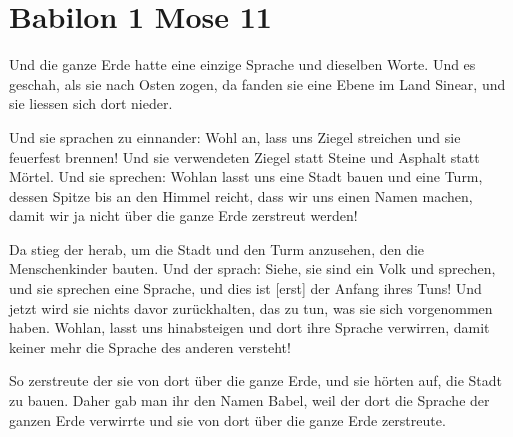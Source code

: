 \documentclass[fontsize=16pt]{mybib}
\author{Lothar Schmid}
\begin{document}
\setlength{\baselineskip}{1.5\baselineskip}

\section{Babilon 1 Mose 11}

 Und die ganze Erde hatte eine einzige Sprache und dieselben Worte.  Und es geschah, als sie nach Osten zogen, da fanden sie eine Ebene im Land Sinear, und sie liessen sich dort nieder.

Und sie sprachen zu einnander: Wohl an, lass uns Ziegel streichen und sie feuerfest brennen! Und sie verwendeten Ziegel statt Steine und Asphalt statt Mörtel. Und sie sprechen: Wohlan lasst uns eine Stadt bauen und eine Turm, dessen Spitze bis an den Himmel reicht, dass wir uns einen Namen machen, damit wir ja nicht über die ganze Erde zerstreut werden!

Da stieg der \herr herab, um die Stadt und den Turm anzusehen, den die Menschenkinder bauten. Und der \herr sprach: Siehe, sie sind ein Volk und sprechen, und sie sprechen eine Sprache, und dies ist [erst] der Anfang ihres Tuns! Und jetzt wird sie nichts davor zurückhalten, das zu tun, was sie sich vorgenommen haben. Wohlan, lasst uns hinabsteigen und dort ihre Sprache verwirren, damit keiner mehr die Sprache des anderen versteht!

So zerstreute der \herr sie von dort über die ganze Erde, und sie hörten auf, die Stadt zu bauen. Daher gab man ihr den Namen Babel, weil der \herr dort die Sprache der ganzen Erde verwirrte und sie von dort über die ganze Erde zerstreute.
\end{document}
